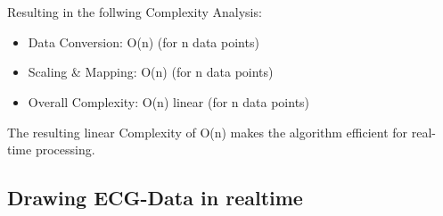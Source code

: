 {\mbox{}\\

\mbox{}\\
Resulting in the follwing Complexity Analysis: 
\begin{itemize}
	\item Data Conversion: O(n) (for n data points)
	\item Scaling \& Mapping: O(n) (for n data points)
	\item Overall Complexity: O(n) linear (for n data points)
\end{itemize}
The resulting linear Complexity of O(n) makes the algorithm efficient for real-time processing. \cite{Liu1973Scheduling}


}
\subsection{Drawing ECG-Data in realtime}
